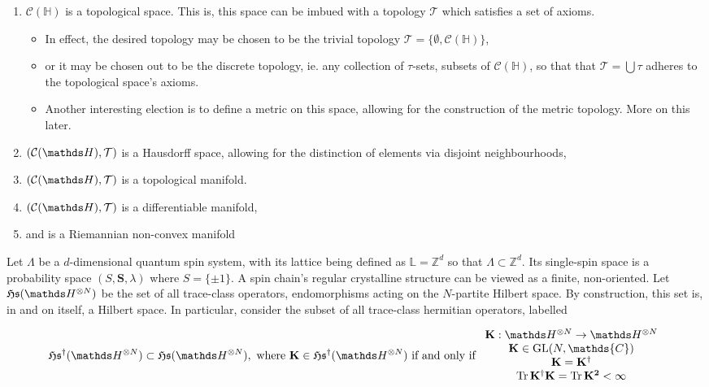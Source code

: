\documentclass{homework}
\begin{document}
\begin{enumerate}
    \item $\mathcal{C}(\mathds{H})$ is a topological space. This is, this space can be imbued with a topology $\mathcal{T}$ which satisfies a set of axioms. 
    \begin{itemize}
        \item In effect, the desired topology may be chosen to be the trivial topology $\mathcal{T} = \{\emptyset, \mathcal{C}(\mathds{H})\}$,
        \item or it may be chosen out to be the discrete topology, ie. any collection of $\tau$-sets, subsets of $\mathcal{C}(\mathds{H})$, so that that $\mathcal{T} = \bigcup \tau$ adheres to the topological space's axioms. 
        \item Another interesting election is to define a metric on this space, allowing for the construction of the metric topology. More on this later.   
    \end{itemize}
    \item $\topospace$ is a Hausdorff space, allowing for the distinction of elements via disjoint neighbourhoods, 
    \item $\topospace$ is a topological manifold. \item $\topospace$ is a differentiable manifold,
    \item and is a Riemannian non-convex manifold
\end{enumerate}

Let $\Lambda$ be a $d$-dimensional quantum spin system, with its lattice being defined as $\mathds{L} = \mathds{Z}^d$ so that $\Lambda \subset \mathds{Z}^d$. Its single-spin space is a probability space $(S, {\bm S}, \lambda)$ where $S = \{\pm 1\}$. A spin chain's regular crystalline structure can be viewed as a finite, non-oriented. Let $\mathfrak{H}\mathfrak{s}(\hilbert^{\otimes N})$ be the set of all trace-class operators, endomorphisms acting on the $N$-partite Hilbert space. By construction, this set is, in and on itself, a Hilbert space. In particular, consider the subset of all trace-class hermitian operators, labelled 

\begin{equation}
    \mathfrak{H}\mathfrak{s}^{\dagger}(\hilbert^{\otimes N}) \subset \mathfrak{H}\mathfrak{s}(\hilbert^{\otimes N}), \textnormal{ where } {\bf K} \in \mathfrak{H}\mathfrak{s}^{\dagger}(\hilbert^{\otimes N}) \textnormal{ if and only if } \begin{array}{c}
         {\bf K}: \hilbert^{\otimes N}          \rightarrow \hilbert^{\otimes N} \\
         {\bf K} \in \textnormal{GL}(N, \mathds{C}) \\
         {\bf K} = \bf K^\dagger  \\
         \Tr \bf K^\dagger {\bf K} = \Tr \bf K^2 < \infty 
    \end{array}
\end{equation}
\end{document}
